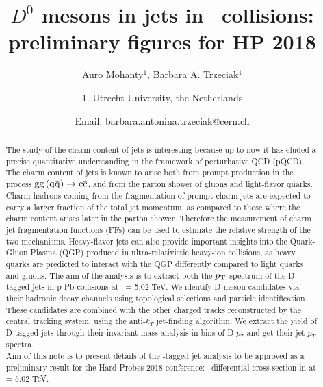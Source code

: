 \documentclass[ALICE,manyauthors]{ALICE_analysis_notes}
\begin{document}
%
%
%
\begin{titlepage}
%
\PHdate{\today}
%
\title{$D^{0}$ mesons in jets in \pp\ collisions: preliminary figures for HP 2018}
%
\author{Auro Mohanty$^{1}$, Barbara A. Trzeciak$^{1}$}
\author{
1. Utrecht University, the Netherlands\\
}
\author{Email: barbara.antonina.trzeciak@cern.ch}
%
%
\begin{abstract}
The study of the charm content of jets is interesting because up to now
it has eluded a precise quantitative understanding in the framework of perturbative QCD (pQCD).
The charm content of jets is known to arise both from prompt production in the process ${\rm gg\, (q\bar{q})} \rightarrow {\rm c\bar{c}}$, and
from the parton shower of gluons and light-flavor quarks.
Charm hadrons coming from the fragmentation of prompt charm jets 
are expected to carry a larger fraction of the total jet momentum,
as compared to those where the charm content arises later in the
parton shower. Therefore the measurement of charm jet fragmentation functions (FFs) 
can be used to estimate the relative strength of the two mechanisms.
Heavy-flavor jets can also provide important insights into the Quark-Gluon Plasma (QGP)
produced in ultra-relativistic heavy-ion collisions, as heavy quarks are predicted
to interact with the QGP differently compared to light quarks and gluons. 
The aim of the analysis is to extract both the $p_{\rm T}$ spectrum of the D-tagged jets in p-Pb collisions at \snn\ = 5.02 TeV. 
We identify D-meson candidates via their hadronic decay channels using topological selections and particle identification. These 
candidates are combined with the other charged tracks reconstructed by the central tracking system, using the anti-$k_T$ jet-finding algorithm. 
We extract the yield of D-tagged jets through their invariant mass analysis in bins of D $p_T$ and get their jet $p_T$ spectra.  \\

Aim of this note is to present details of the \Dzero-tagged jet analysis to be approved as a preliminary result for the Hard Probes 2018 conference: \pt\ differential cross-section in \pp at \snn = 5.02 TeV.
\end{abstract}
\end{titlepage}
%
\tableofcontents
\end{document}
